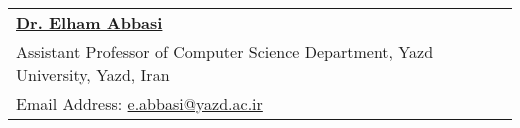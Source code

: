 \documentclass[a4paper,12pt]{article}
\begin{document}
\begin{tabularx}{\linewidth}{ @{}l X@{} }
\href{https://yazd.ac.ir/people/e.abbasi/}{\textbf{\color{black}Dr. Elham Abbasi}}\\
\hspace{0.9cm}Assistant Professor of Computer Science Department, Yazd University, Yazd, Iran \\
\hspace{0.9cm}Email Address: \href{mailto:e.abbasi@yazd.ac.ir@yazd.ac.ir}{e.abbasi@yazd.ac.ir} \\
\end{tabularx}




\end{document}

